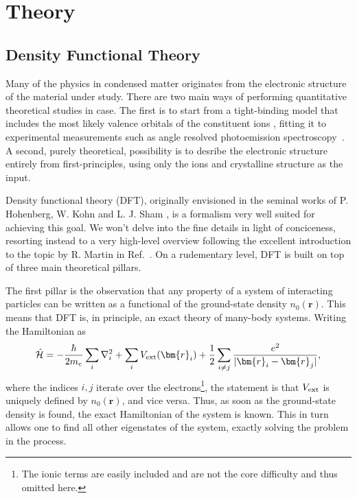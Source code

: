 \chapter{Theory}

\section{Density Functional Theory \label{sec:DFT}}
Many of the physics in condensed matter originates from the electronic structure of the material under study.
There are two main ways of performing quantitative theoretical studies in case.
The first is to start from a tight-binding model that includes the most likely valence orbitals of the constituent ions \cite{Slater1954}, fitting it to experimental measurements such as angle resolved photoemission spectroscopy~\cite{Damascelli2004}.
A second, purely theoretical, possibility is to desribe the electronic structure entirely from first-principles, using only the ions and crystalline structure as the input. 

Density functional theory (DFT), originally envisioned in the seminal works of P. Hohenberg, W. Kohn and L. J. Sham \cite{Hohenberg1964,Kohn1965}, is a formalism very well suited for achieving this goal.
We won't delve into the fine details in light of conciceness, resorting instead to a very high-level overview following the excellent introduction to the topic by R. Martin in Ref.~\cite{Martin2004}.
On a rudementary level, DFT is built on top of three main theoretical pillars.

The first pillar is the observation that any property of a system of interacting particles can be written as a functional of the ground-state density $n_0(\bm{r})$.
This means that DFT is, in principle, an exact theory of many-body systems.
Writing the Hamiltonian as
\begin{equation}
	\hat{\mathcal{H}} = -\frac{\hbar}{2m_e} \sum_i \nabla_i^2 + \sum_i V_{\rm ext}(\bm{r}_i) + \frac{1}{2}\sum_{i\neq j} \frac{e^2}{|\bm{r}_i - \bm{r}_j|},
\end{equation}
where the indices $i,j$ iterate over the electrons\footnote{The ionic terms are easily included and are not the core difficulty and thus omitted here.}, the statement is that $V_{\rm ext}$ is uniquely defined by $n_0(\bm{r})$, and vice versa.
Thus, as soon as the ground-state density is found, the exact Hamiltonian of the system is known.
This in turn allows one to find all other eigenstates of the system, exactly solving the problem in the process.

